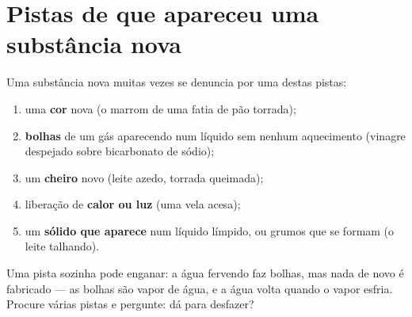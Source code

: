 \section{Pistas de que apareceu uma substância nova}

\begin{method}\label{met:g5:irreversible-changes:clues}
Uma substância nova muitas vezes se denuncia por uma destas pistas:
\begin{enumerate}
  \item uma \textbf{cor} nova (o marrom de uma fatia de pão torrada);
  \item \textbf{bolhas} de um gás aparecendo num líquido sem nenhum
        aquecimento (vinagre despejado sobre bicarbonato de sódio);
  \item um \textbf{cheiro} novo (leite azedo, torrada queimada);
  \item liberação de \textbf{calor ou luz} (uma vela acesa);
  \item um \textbf{sólido que aparece} num líquido límpido, ou grumos que
        se formam (o leite talhando).
\end{enumerate}
Uma pista sozinha pode enganar: a água fervendo faz bolhas, mas nada de
novo é fabricado --- as bolhas são vapor de água, e a água volta quando
o vapor esfria. Procure várias pistas e pergunte: dá para desfazer?
\end{method}

